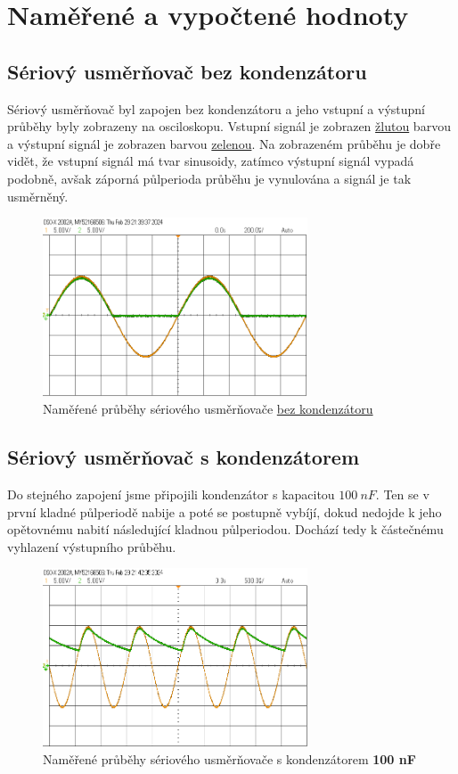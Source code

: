 \documentclass[a4paper, czech]{article}
\begin{document}
\newpage

\section{Naměřené a vypočtené hodnoty}

\subsection{Sériový usměrňovač bez kondenzátoru}

Sériový usměrňovač byl zapojen bez kondenzátoru a jeho vstupní a výstupní průběhy byly zobrazeny na osciloskopu. Vstupní signál je zobrazen \underline{žlutou} barvou a výstupní signál je zobrazen barvou \underline{zelenou}. Na zobrazeném průběhu je dobře vidět, že vstupní signál má tvar sinusoidy, zatímco výstupní signál vypadá podobně, avšak záporná půlperioda průběhu je vynulována a signál je tak usměrněný.

\begin{figure}[H]
    \centering
    \includegraphics[width=0.7\textwidth]{scope_1.png}
    \caption{Naměŕené průběhy sériového usměrňovače \underline{bez kondenzátoru}}
\end{figure}

\subsection{Sériový usměrňovač s kondenzátorem}

Do stejného zapojení jsme připojili kondenzátor s kapacitou $100\ nF$. Ten se v první kladné půlperiodě nabije a poté se postupně vybíjí, dokud nedojde k jeho opětovnému nabití následující kladnou půlperiodou. Dochází tedy k částečnému vyhlazení výstupního průběhu.

\begin{figure}[H]
    \centering
    \includegraphics[width=0.7\textwidth]{scope_2.png}
    \caption{Naměřené průběhy sériového usměrňovače s kondenzátorem \textbf{100 nF}}
\end{figure}
\end{document}
